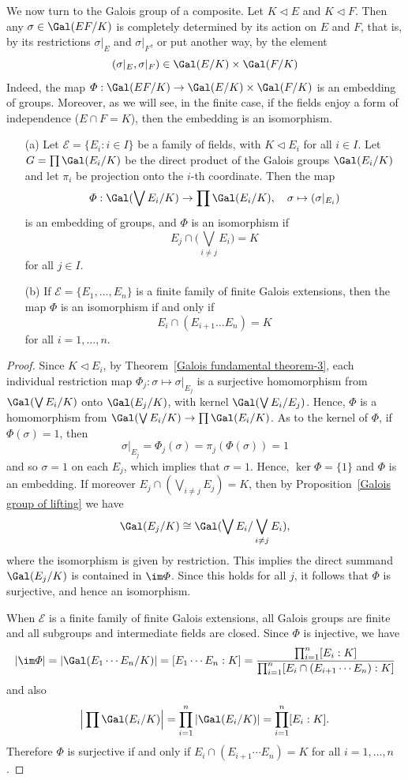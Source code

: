 We now turn to the Galois group of a composite. Let $K\lhd E$ and $K\lhd F$. Then any $\sigma\in\Gal(EF/K)$ is completely determined by its action on $E$ and $F$, that is, by its restrictions $\sigma|_E$ and $\sigma|_F$, or put another way, by the element
\[(\sigma|_E,\sigma|_F)\in\Gal(E/K)\times\Gal(F/K)\]
Indeed, the map $\varPhi:\Gal(EF/K)\to\Gal(E/K)\times\Gal(F/K)$ is an embedding of groups. Moreover, as we will see, in the finite case, if the fields enjoy a form of independence ($E\cap F=K$), then the embedding is an isomorphism.
\begin{proposition}\label{Galois group of a composite}
\mbox{}
\begin{itemize}
\item[(a)] Let $\mathcal{E}=\{E_i:i\in I\}$ be a family of fields, with $K\lhd E_i$ for all $i\in I$. Let $G=\prod\Gal(E_i/K)$ be the direct product of the Galois groups $\Gal(E_i/K)$ and let $\pi_i$ be projection onto the $i$-th coordinate. Then the map
\[\varPhi:\Gal(\bigvee E_i/K)\to\prod\Gal(E_i/K),\quad \sigma\mapsto(\sigma|_{E_i})\]
is an embedding of groups, and $\varPhi$ is an isomorphism if
\[E_j\cap\Big(\bigvee_{i\neq j}E_i\Big)=K\]
for all $j\in I$.
\item[(b)] If $\mathcal{E}=\{E_1,\dots,E_n\}$ is a finite family of finite Galois extensions, then the map $\varPhi$ is an isomorphism if and only if
\[E_i\cap(E_{i+1}\dots E_n)=K\]
for all $i=1,\dots,n$.  
\end{itemize}
\end{proposition}
\begin{proof}
Since $K\lhd E_i$, by Theorem~\ref{Galois fundamental theorem-3}, each individual restriction map $\varPhi_j:\sigma\mapsto\sigma|_{E_j}$ is a surjective homomorphism from $\Gal(\bigvee E_i/K)$ onto $\Gal(E_j/K)$, with kernel $\Gal(\bigvee E_i/E_j)$. Hence, $\varPhi$ is a homomorphism from $\Gal(\bigvee E_i/K)\to\prod\Gal(E_i/K)$. As to the kernel of $\varPhi$, if $\varPhi(\sigma)=1$, then
\[\sigma|_{E_j}=\varPhi_j(\sigma)=\pi_j(\varPhi(\sigma))=1\]
and so $\sigma=1$ on each $E_j$, which implies that $\sigma=1$. Hence, $\ker\varPhi=\{1\}$ and $\varPhi$ is an embedding. If moreover $E_j\cap(\bigvee_{i\neq j}E_j)=K$, then by Proposition~\ref{Galois group of lifting} we have
\[\Gal(E_j/K)\cong\Gal(\bigvee E_i/\bigvee_{i\neq j}E_i),\]
where the isomorphism is given by restriction. This implies the direct summand $\Gal(E_j/K)$ is contained in $\im\varPhi$. Since this holds for all $j$, it follows that $\varPhi$ is surjective, and hence an isomorphism.\par
When $\mathcal{E}$ is a finite family of finite Galois extensions, all Galois groups are finite and all subgroups and intermediate fields are closed. Since $\varPhi$ is injective, we have
\[|\im\varPhi|=|\Gal(E_1\cdots E_n/K)|=[E_1\cdots E_n:K]=\frac{\prod_{i=1}^{n}[E_i:K]}{\prod_{i=1}^{n}[E_i\cap(E_{i+1}\cdots E_n):K]}\]
and also
\[\Big|\prod\Gal(E_i/K)\Big|=\prod_{i=1}^{n}|\Gal(E_i/K)|=\prod_{i=1}^{n}[E_i:K].\]
Therefore $\varPhi$ is surjective if and only if $E_i\cap(E_{i+1}\cdots E_n)=K$ for all $i=1,\dots,n$.
\end{proof}
